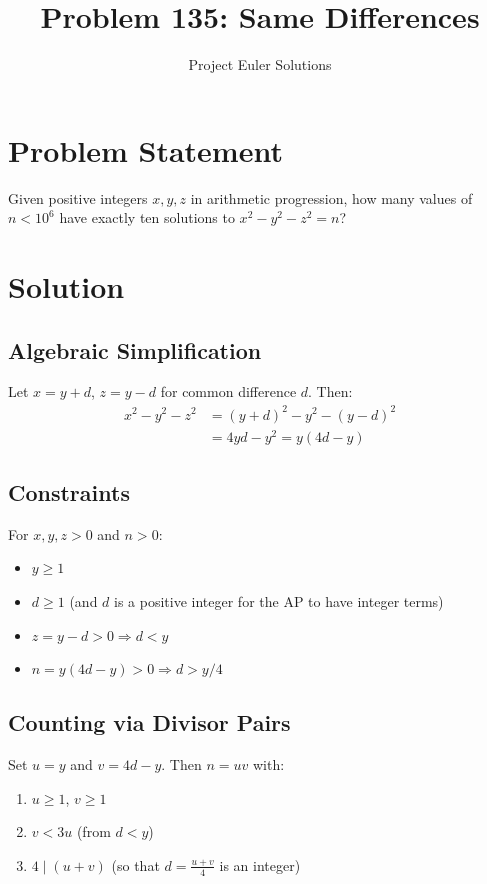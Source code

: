 \documentclass[12pt]{article}
\title{Problem 135: Same Differences}
\author{Project Euler Solutions}
\date{}
\begin{document}
\maketitle

\section{Problem Statement}
Given positive integers $x, y, z$ in arithmetic progression, how many values of $n < 10^6$ have exactly ten solutions to $x^2 - y^2 - z^2 = n$?

\section{Solution}

\subsection{Algebraic Simplification}
Let $x = y + d$, $z = y - d$ for common difference $d$. Then:
\begin{align}
x^2 - y^2 - z^2 &= (y+d)^2 - y^2 - (y-d)^2 \\
&= 4yd - y^2 = y(4d - y)
\end{align}

\subsection{Constraints}
For $x, y, z > 0$ and $n > 0$:
\begin{itemize}
    \item $y \geq 1$
    \item $d \geq 1$ (and $d$ is a positive integer for the AP to have integer terms)
    \item $z = y - d > 0 \Rightarrow d < y$
    \item $n = y(4d - y) > 0 \Rightarrow d > y/4$
\end{itemize}

\subsection{Counting via Divisor Pairs}

Set $u = y$ and $v = 4d - y$. Then $n = uv$ with:
\begin{enumerate}
    \item $u \geq 1$, $v \geq 1$
    \item $v < 3u$ (from $d < y$)
    \item $4 \mid (u + v)$ (so that $d = \frac{u+v}{4}$ is an integer)
\end{enumerate}
\end{document}
